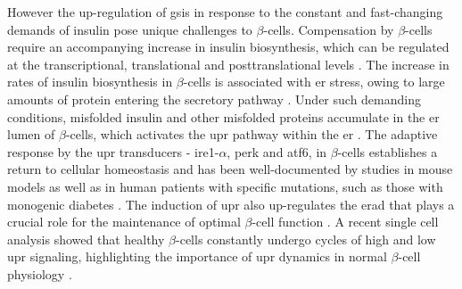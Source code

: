 \par However the up-regulation of \gls{gsis} in response to the constant and fast-changing demands of insulin pose unique challenges to $\beta$-cells. Compensation by $\beta$-cells require an accompanying increase in insulin biosynthesis, which can be regulated at the transcriptional, translational and posttranslational levels \textbf{\cite{prentki_islet_2006}}. The increase in rates of insulin biosynthesis in $\beta$-cells is associated with \gls{er} stress, owing to large amounts of protein entering the secretory pathway \textbf{\cite{yong_therapeutic_2021}}. Under such demanding conditions, misfolded insulin and other misfolded proteins accumulate in the \gls{er} lumen of $\beta$-cells, which activates the \gls{upr} pathway within the \gls{er} \textbf{\cite{miranda_pancreatic_2021}}. The adaptive response by the \gls{upr} transducers - \gls{ire1}-$\alpha$, \gls{perk} and \gls{atf6}, in $\beta$-cells establishes a return to cellular homeostasis and has been well-documented by studies in mouse models as well as in human patients with specific mutations, such as those with monogenic diabetes \textbf{\cite{yong_therapeutic_2021}}. The induction of \gls{upr} also up-regulates the \gls{erad} that plays a crucial role for the maintenance of optimal $\beta$-cell function \textbf{\cite{yong_therapeutic_2021}}. A recent single cell analysis showed that healthy $\beta$-cells constantly undergo cycles of high and low \gls{upr} signaling, highlighting the importance of \gls{upr} dynamics in normal $\beta$-cell physiology \textbf{\cite{xin_pseudotime_2018}}.\\



